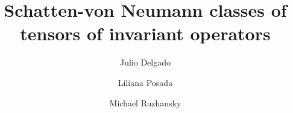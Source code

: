 \documentclass[a4paper,12pt,reqno]{amsart}
\theoremstyle{definition}
\theoremstyle{remark}
\numberwithin{equation}{section}
\def\br#1{{\left[{#1}\right]}}
\begin{document}
 

%
%
%
%
%
%
%
%
%
\title[Schatten-von Neumann classes of tensors ]
 {Schatten-von Neumann classes of  tensors of invariant operators }


\author{Julio Delgado}

\address{Universidad del Valle\\
Departamento de Matematicas\\
Calle 13 100-00\\
Cali\\
Colombia}


\author{Liliana Posada}

\address{Universidad del Valle\\
Departamento de Matematicas\\
Calle 13 100-00\\
Cali\\
Colombia}




\author[Michael Ruzhansky]{Michael Ruzhansky}

\address{%
		Ghent University\\
	Department of Mathematics: Analysis, Logic and Discrete Mathematics\\
	Krijgslaan 281, Building S8 \\
	B 9000 Ghent\\
	Belgium}


\address{%
	Queen Mary University of London
	School of Mathematical Sciences\\
	Mile End Road\\
	London E1 4NS\\
	United Kingdom}
\end{document}
